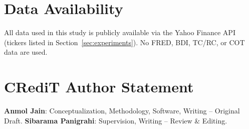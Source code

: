 \documentclass[journal]{IEEEtran}
\begin{document}
\section*{Data Availability}

All data used in this study is publicly available via the Yahoo Finance API (tickers listed in Section~\ref{sec:experiments}). No FRED, BDI, TC/RC, or COT data are used.

\section*{CRediT Author Statement}

\textbf{Anmol Jain}: Conceptualization, Methodology, Software, Writing -- Original Draft. \textbf{Sibarama Panigrahi}: Supervision, Writing -- Review \& Editing.
\end{document}
